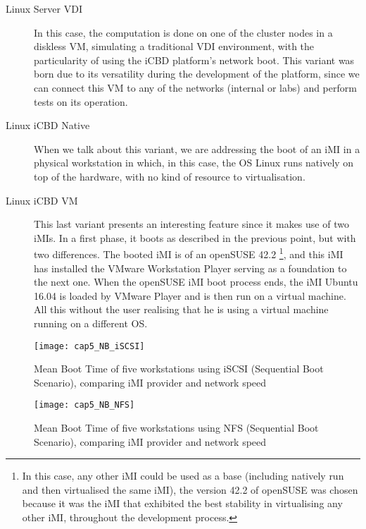 \begin{description}
	\item [Linux Server VDI] In this case, the computation is done on one of the cluster nodes in a diskless VM, simulating a traditional VDI environment, with the particularity of using the iCBD platform's network boot. This variant was born due to its versatility during the development of the platform, since we can connect this VM to any of the networks (internal or labs) and perform tests on its operation.
	\item [Linux iCBD Native] When we talk about this variant, we are addressing the boot of an iMI in a physical workstation in which, in this case, the OS Linux runs natively on top of the hardware, with no kind of resource to virtualisation.
	\item [Linux iCBD VM] This last variant presents an interesting feature since it makes use of two iMIs. In a first phase, it boots as described in the previous point, but with two differences. The booted iMI is of an openSUSE 42.2 \footnote{In this case, any other iMI could be used as a base (including natively run and then virtualised the same iMI), the version  42.2 of openSUSE was chosen because it was the iMI that exhibited the best stability in virtualising any other iMI, throughout the development process.}, and this iMI has installed the VMware Workstation Player serving as a foundation to the next one. When the openSUSE iMI boot process ends, the iMI Ubuntu 16.04 is loaded by VMware Player and is then run on a virtual machine. All this without the user realising that he is using a virtual machine running on a different OS.
\end{description}

\begin{figure}[htbp]
	\centering
	\texttt{[image: cap5\_NB\_iSCSI]}
	\caption{Mean Boot Time of five workstations using iSCSI (Sequential Boot Scenario), comparing iMI provider and network speed}
	\label{fig:boot_iscsi}
\end{figure}

\begin{figure}[htbp]
	\centering
	\texttt{[image: cap5\_NB\_NFS]}
	\caption{Mean Boot Time of five workstations using NFS (Sequential Boot Scenario), comparing iMI provider and network speed}
	\label{fig:boot_nfs}
\end{figure}

